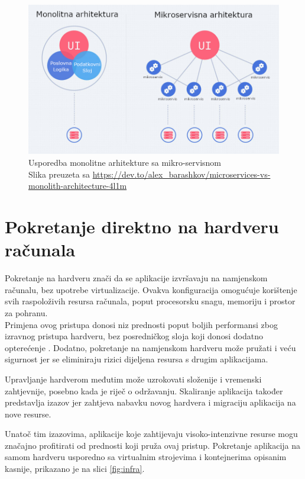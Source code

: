 \documentclass[times, utf8, diplomski]{fer}
\begin{document}
\begin{figure}[htb]
	\centering
	\includegraphics[width=15cm]{images/microservice.png}
	\caption[Usporedba monolitne arhitekture sa mikro-servisnom]{Usporedba monolitne arhitekture sa mikro-servisnom\\Slika preuzeta sa \url{https://dev.to/alex_barashkov/microservices-vs-monolith-architecture-4l1m}}
	\label{fig:microservice}
\end{figure}


\section{Pokretanje direktno na hardveru računala}

Pokretanje na hardveru  znači da se aplikacije izvršavaju na namjenskom računalu, bez upotrebe virtualizacije. Ovakva konfiguracija omogućuje korištenje svih raspoloživih resursa računala, poput procesorsku snagu, memoriju i prostor za pohranu. \\

Primjena ovog pristupa donosi niz prednosti poput boljih performansi zbog izravnog pristupa hardveru, bez posredničkog sloja koji donosi dodatno opterećenje . Dodatno, pokretanje na namjenskom hardveru može pružati i veću sigurnost jer se eliminiraju rizici dijeljena resursa s drugim aplikacijama.

Upravljanje hardverom međutim može uzrokovati složenije i vremenski zahtjevnije, posebno kada je riječ o održavanju. Skaliranje aplikacija također predstavlja izazov jer zahtjeva nabavku novog hardvera i migraciju aplikacija na nove resurse.

Unatoč tim izazovima, aplikacije koje zahtijevaju visoko-intenzivne resurse mogu značajno profitirati od prednosti koji pruža ovaj pristup. Pokretanje aplikacija na samom hardveru usporedno sa virtualnim strojevima i kontejnerima opisanim kasnije, prikazano je na slici \ref{fig:infra}.
\end{document}
